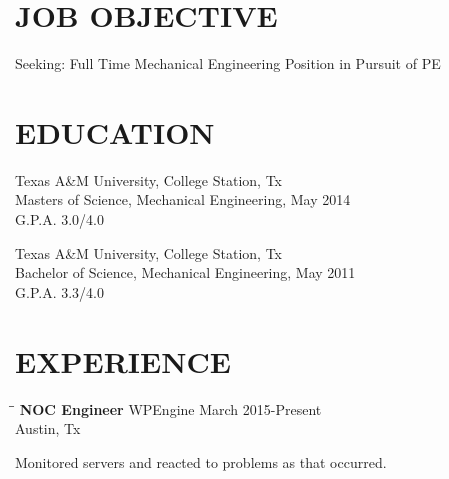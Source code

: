 \documentclass{res}
\begin{document}
 

\address{\bf  PRESENT ADDRESS\\2306 Carnation Ct.\\College Station, Tx 77840\\(806) 486-1918}
\address{\bf PERMANENT ADDRESS \\ 12451 Co Rd D 1/2\\Pampa, Tx 79065\\(806) 886-7213}
                                  
\begin{resume}

\section{JOB OBJECTIVE}          
Seeking: Full Time Mechanical Engineering Position in Pursuit of PE
 
\section{EDUCATION}  
	Texas A\&M University, College Station, Tx \\
	Masters of Science, Mechanical Engineering, May 2014 \\
	G.P.A. 3.0/4.0

	Texas A\&M University, College Station, Tx \\
	Bachelor of Science, Mechanical Engineering, May 2011 \\
	G.P.A. 3.3/4.0
 
\section{EXPERIENCE}
   \vspace{-0.1in}	
   \begin{tabbing}
   \hspace{2.5in}\= \hspace{2.6in}\= \kill %
   {\bf NOC Engineer} \>WPEngine     \>March 2015-Present\\
    \>Austin, Tx
   \end{tabbing}\vspace{-20pt}      %
   Monitored servers and reacted to problems as that occurred. 


\end{resume}
\end{document}
